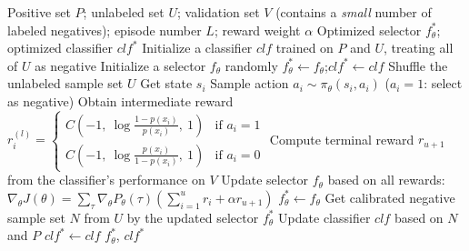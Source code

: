 \documentclass{article}
\begin{document}
\begin{algorithm}[!h]
\renewcommand{\algorithmicrequire}{\textbf{Input:}} %
\renewcommand{\algorithmicensure}{\textbf{Output:}} %
	\caption{PULNS (reinforced negative sample selection)} %
	\begin{algorithmic}[1] %
	    \REQUIRE
	    Positive set $P$; unlabeled set $U$; validation set $V$ (contains a \emph{small} number of
	    labeled negatives); episode number $L$; reward weight $\alpha$
	    \ENSURE
	    Optimized selector $f_{\theta}^{\ast}$; optimized classifier $clf^{\ast}$
	    \STATE Initialize a classifier $clf$ trained on $P$ and $U$, treating all of $U$ as negative %
	    \STATE Initialize a selector $f_{\theta}$ randomly
	    \STATE $f_{\theta}^{\ast}\leftarrow f_{\theta}$;\quad $clf^{\ast}\leftarrow clf$
	    \STATE Shuffle the unlabeled sample set $U$
	    \STATE Get state $s_{i}$
	    \STATE Sample action $a_{i}\sim \pi_{\theta}(s_{i},a_{i})$ \quad ($a_{i}=1$: select as negative) %
	    \STATE Obtain intermediate reward
	    $r_{i}^{(l)}=\begin{cases}
	    C\!\left(-1,\ \log\frac{1-p(x_{i})}{p(x_{i})},\ 1\right) & \text{if } a_{i}=1\\[2pt]
	    C\!\left(-1,\ \log\frac{p(x_{i})}{1-p(x_{i})},\ 1\right) & \text{if } a_{i}=0
	    \end{cases}$ %
	    \ENDFOR
	    \STATE Compute terminal reward $r_{u+1}$ from the classifier's performance on $V$ %
	    \STATE Update selector $f_{\theta}$ based on all rewards:
	    $\nabla_{\theta}J(\theta)=\sum_{\tau}\nabla_{\theta}P_{\theta}(\tau)\left(\sum_{i=1}^{u}r_{i}+\alpha r_{u+1}\right)$ %
	    \STATE $f_{\theta}^{\ast}\leftarrow f_{\theta}$
	    \STATE Get calibrated negative sample set $N$ from $U$ by the updated selector $f_{\theta}^{\ast}$
	    \STATE Update classifier $clf$ based on $N$ and $P$ %
	    \STATE $clf^{\ast}\leftarrow clf$
	    \ENDIF
	    \ENDFOR
		\RETURN $f_{\theta}^{\ast}$, $clf^{\ast}$
	\end{algorithmic}
\end{algorithm}
\end{document}
